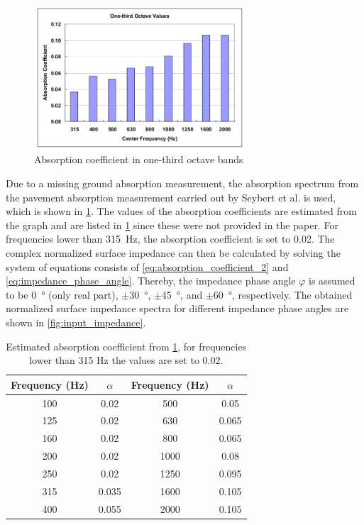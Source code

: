 \begin{figure}[H]
	\centering
	\includegraphics[width=0.7\textwidth]{fig/chap4/impedance/absorption_spectrum.png}
	\caption{Absorption coefficient in one-third octave bands \cite{Seybert2008MeasurementOP}}
	\label{fig:ground_absorption}
\end{figure}

Due to a missing ground absorption measurement, the absorption spectrum from the pavement absorption measurement carried out by Seybert et al. \cite{Seybert2008MeasurementOP} is used, which is shown in \cref{fig:ground_absorption}.
The values of the absorption coefficients are estimated from the graph and are listed in \cref{tab:absorption_coefficient} since these were not provided in the paper. For frequencies lower than \SI{315}{\hertz}, the absorption coefficient is set to 0.02. The complex normalized surface impedance can then be calculated by solving the system of equations consists of \cref{eq:absorption_coefficient_2} and \cref{eq:impedance_phase_angle}. Thereby, the impedance phase angle $\varphi$ is assumed to be \SI{0}{\degree} (only real part), $\pm$\SI{30}{\degree}, $\pm$\SI{45}{\degree}, and $\pm$\SI{60}{\degree}, respectively. The obtained normalized surface impedance spectra for different impedance phase angles are shown in \cref{fig:input_impedance}.

\begin{table}[H]
	\centering
	\caption{Estimated absorption coefficient from \cref{fig:ground_absorption}, for frequencies lower than 315 Hz the values are set to 0.02.}
	\label{tab:absorption_coefficient}
	\begin{tabular}{cccc}
		\toprule
		Frequency (Hz) & $\alpha$ & Frequency (Hz) & $\alpha$ \\
		\midrule
		100 & 0.02 & 500 & 0.05 \\
		125 & 0.02 & 630 & 0.065 \\
		160 & 0.02 & 800 & 0.065 \\
		200 & 0.02 & 1000 & 0.08 \\
		250 & 0.02 & 1250 & 0.095 \\
		315 & 0.035 & 1600 & 0.105 \\
		400 & 0.055 & 2000 & 0.105 \\
		\bottomrule
	\end{tabular}
\end{table}

